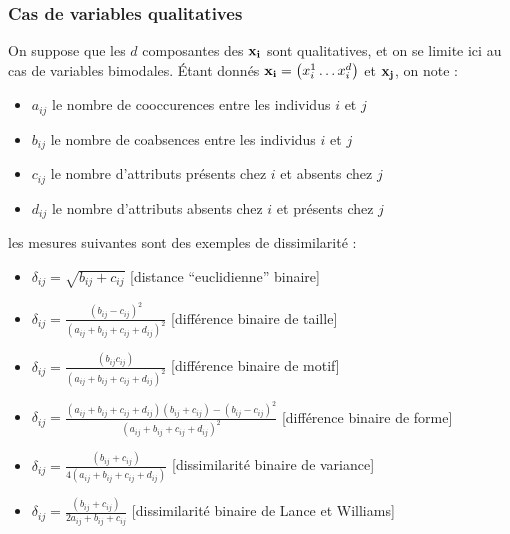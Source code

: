 \documentclass[letterpaper,10pt,english]{jupyterBook}
\begin{document}
\subsubsection{Cas de variables qualitatives}
\label{\detokenize{clustering:cas-de-variables-qualitatives}}
\sphinxAtStartPar
On suppose que les \(d\) composantes des \({\bf x_i}\) sont qualitatives, et on se limite ici au cas de variables bimodales.
Étant donnés \({\bf x_i}=\begin{pmatrix} x_i^1\ldots x_i^d\end{pmatrix}\) et \({\bf x_j}\), on note :
\begin{itemize}
\item {} 
\sphinxAtStartPar
\(a_{ij}\) le nombre de co\sphinxhyphen{}occurences entre les individus \(i\) et \(j\)

\item {} 
\sphinxAtStartPar
\(b_{ij}\) le nombre de co\sphinxhyphen{}absences entre les individus \(i\) et \(j\)

\item {} 
\sphinxAtStartPar
\(c_{ij}\) le nombre d’attributs présents chez \(i\) et absents chez \(j\)

\item {} 
\sphinxAtStartPar
\(d_{ij}\) le nombre d’attributs absents chez \(i\) et présents chez \(j\)

\end{itemize}

\sphinxAtStartPar
les mesures suivantes sont des exemples de dissimilarité :
\begin{itemize}
\item {} 
\sphinxAtStartPar
\(\delta_{ij} = \sqrt{b_{ij}+c_{ij}}\) {[}distance “euclidienne” binaire{]}

\item {} 
\sphinxAtStartPar
\(\delta_{ij} = \frac{(b_{ij}-c_{ij})^2}{(a_{ij}+b_{ij}+c_{ij}+d_{ij})^2}\) {[}différence binaire de taille{]}

\item {} 
\sphinxAtStartPar
\(\delta_{ij} = \frac{(b_{ij}c_{ij})}{(a_{ij}+b_{ij}+c_{ij}+d_{ij})^2}\) {[}différence binaire de motif{]}

\item {} 
\sphinxAtStartPar
\(\delta_{ij} = \frac{(a_{ij}+b_{ij}+c_{ij}+d_{ij})(b_{ij}+c_{ij})-(b_{ij}-c_{ij})^2}{(a_{ij}+b_{ij}+c_{ij}+d_{ij})^2}\) {[}différence binaire de forme{]}

\item {} 
\sphinxAtStartPar
\(\delta_{ij} = \frac{(b_{ij}+c_{ij})}{4(a_{ij}+b_{ij}+c_{ij}+d_{ij})}\) {[}dissimilarité binaire de variance{]}

\item {} 
\sphinxAtStartPar
\(\delta_{ij} = \frac{(b_{ij}+c_{ij})}{2a_{ij}+b_{ij}+c_{ij}}\) {[}dissimilarité binaire de Lance et Williams{]}

\end{itemize}
\end{document}
